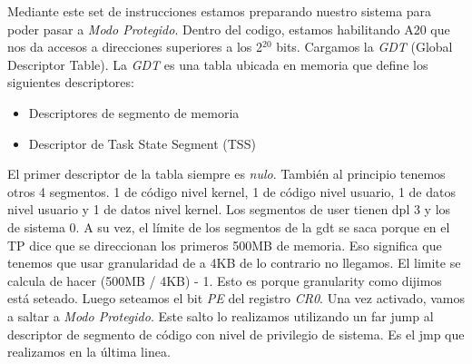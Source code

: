 Mediante este set de instrucciones estamos preparando nuestro sistema para poder pasar a \textit{Modo Protegido}.
Dentro del codigo, estamos habilitando A20 que nos da accesos a direcciones superiores a los 2$^{20}$ bits.\newline
Cargamos la \textit{GDT} (Global Descriptor Table).
La \textit{GDT} es una tabla ubicada en memoria que define los siguientes descriptores:
\begin{itemize}
    \item Descriptores de segmento de memoria
    \item Descriptor de Task State Segment (TSS)
\end{itemize}
El primer descriptor de la tabla siempre es \textit{nulo}. También al principio tenemos otros 4 segmentos. 1 de código nivel kernel, 1 de código nivel usuario, 1 de datos nivel usuario y 1 de datos nivel kernel. Los segmentos de user tienen dpl 3 y los de sistema 0. A su vez, el límite de los segmentos de la gdt se saca porque en el TP dice que se direccionan los primeros 500MB de memoria. Eso significa que tenemos que usar granularidad de a 4KB de lo contrario no llegamos. El limite se calcula de hacer (500MB / 4KB) - 1. Esto es porque granularity como dijimos está seteado. Luego seteamos el bit \textit{PE} del registro \textit{CR0}.
\newline
Una vez activado, vamos a saltar a \textit{Modo Protegido}. Este salto lo realizamos utilizando un far jump al descriptor de segmento de c\'odigo con nivel de privilegio de sistema. Es el jmp que realizamos en la \'ultima linea.
